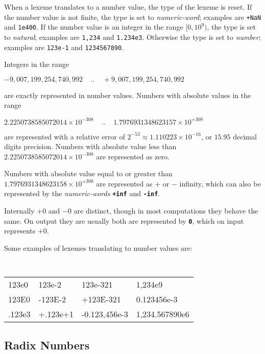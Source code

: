 \documentclass[12pt]{article}
\newcommand{\TT}[1]{{\tt \bfseries #1}}
\newenvironment{indpar}[1][0.3in]%
	{\begin{list}{}%
		     {\setlength{\itemsep}{0in}%
		      \setlength{\topsep}{0in}%
		      \setlength{\parsep}{1ex}%
		      \setlength{\labelwidth}{#1}%
		      \setlength{\leftmargin}{#1}%
		      \addtolength{\leftmargin}{\labelsep}}%
	 \item}%
	{\end{list}}
\begin{document}
When a lexeme translates to a number value, the type of the lexeme
is reset.  If the number value is not finite, the type is set to
{\em numeric-word}; examples are {\tt +NaN} and {\tt 1e400}.
If the number value is an integer in the range $[0,10^9)$, the type
is set to {\em natural}; examples are {\tt 1,234} and {\tt 1.234e3}.
Otherwise the type is set to {\em number}; examples are {\tt 123e-1}
and {\tt 1234567890}.

Integers in the range
\begin{center}
$-9,007,199,254,740,992~~~~~..~~~~~+9,007,199,254,740,992$
\end{center}
are exactly represented in number values.
Numbers with absolute values in the range
\begin{center}
$2.2250738585072014\times 10^{-308}~~~~~..~~~~~1.7976931348623157\times
                                                               10^{+308}$
\end{center}
are represented with a relative error of
$2^{-53} \approx 1.110223\times 10^{-16}$,
or $15.95$ decimal digits precision.  Numbers
with absolute value less than
$2.2250738585072014\times 10^{-308}$ are represented as zero.

Numbers with absolute value equal to or greater than
$1.7976931348623158\times 10^{+308}$ are represented as $+$ or $-$
infinity, which can also be represented by the {\em numeric-words}
\TT{+inf} and \TT{-inf}.

Internally $+0$ and $-0$ are distinct, though in most computations
they behave the same.  On output they are usually
both are represented by \TT{0}, which on input represents $+0$.

Some examples of lexemes translating to number values are:

\begin{indpar}[0.1in]
\tt
\begin{tabular}{l@{~~~}l@{~~~}l@{~~~}l}
123e0		& 123e-2	& 123e-321	& 1,234e9 \\
123E0		& -123E-2	& +123E-321	& 0.123456e-3	\\
.123e3	& +.123e+1
				& -0.123,456e-3 & 1,234.567890e6 \\
\end{tabular}
\end{indpar}

\subsection{Radix Numbers}
\label{RADIX-NUMBER}
\end{document}

